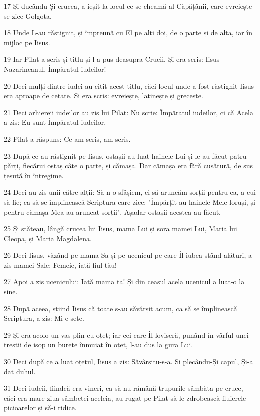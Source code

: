 \par 17 Și ducându-Și crucea, a ieșit la locul ce se cheamă al Căpățânii, care evreiește se zice Golgota,
\par 18 Unde L-au răstignit, și împreună cu El pe alți doi, de o parte și de alta, iar în mijloc pe Iisus.
\par 19 Iar Pilat a scris și titlu și l-a pus deasupra Crucii. Și era scris: Iisus Nazarineanul, Împăratul iudeilor!
\par 20 Deci mulți dintre iudei au citit acest titlu, căci locul unde a fost răstignit Iisus era aproape de cetate. Și era scris: evreiește, latinește și grecește.
\par 21 Deci arhiereii iudeilor au zis lui Pilat: Nu scrie: Împăratul iudeilor, ci că Acela a zis: Eu sunt Împăratul iudeilor.
\par 22 Pilat a răspuns: Ce am scris, am scris.
\par 23 După ce au răstignit pe Iisus, ostașii au luat hainele Lui și le-au făcut patru părți, fiecărui ostaș câte o parte, și cămașa. Dar cămașa era fără cusătură, de sus țesută în întregime.
\par 24 Deci au zis unii către alții: Să n-o sfâșiem, ci să aruncăm sorții pentru ea, a cui să fie; ca să se împlinească Scriptura care zice: "Împărțit-au hainele Mele loruși, și pentru cămașa Mea au aruncat sorții". Așadar ostașii acestea au făcut.
\par 25 Și stăteau, lângă crucea lui Iisus, mama Lui și sora mamei Lui, Maria lui Cleopa, și Maria Magdalena.
\par 26 Deci Iisus, văzând pe mama Sa și pe ucenicul pe care Îl iubea stând alături, a zis mamei Sale: Femeie, iată fiul tău!
\par 27 Apoi a zis ucenicului: Iată mama ta! Și din ceasul acela ucenicul a luat-o la sine.
\par 28 După aceea, știind Iisus că toate s-au săvârșit acum, ca să se împlinească Scriptura, a zis: Mi-e sete.
\par 29 Și era acolo un vas plin cu oțet; iar cei care Îl loviseră, punând în vârful unei trestii de isop un burete înmuiat în oțet, l-au dus la gura Lui.
\par 30 Deci după ce a luat oțetul, Iisus a zis: Săvârșitu-s-a. Și plecându-Și capul, Și-a dat duhul.
\par 31 Deci iudeii, fiindcă era vineri, ca să nu rămână trupurile sâmbăta pe cruce, căci era mare ziua sâmbetei aceleia, au rugat pe Pilat să le zdrobească fluierele picioarelor și să-i ridice.
